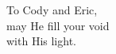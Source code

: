 \label{chap:dedication}

\begin{center}
  \null
  \vspace{2.7in}
  \bigskip
  To Cody and Eric,\\
  may He fill your void\\
  with His light.\\
  \newpage
\end{center}